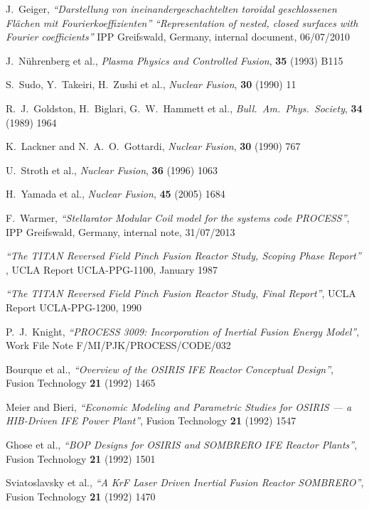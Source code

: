 \documentclass[11pt,a4paper]{report}
\begin{document}
\begin{thebibliography}{99}
J.\ Geiger,
\textit{``Darstellung von ineinandergeschachtelten toroidal geschlossenen
  Fl\"{a}chen mit Fourierkoeffizienten''} \textit{``Representation of
  nested, closed surfaces with Fourier coefficients''}
IPP Greifswald, Germany, internal document, 06/07/2010

J.\ N\"{u}hrenberg et al., \textit{Plasma Physics and Controlled Fusion},
\textbf{35} (1993) B115

S.\ Sudo, Y.\ Takeiri, H.\ Zushi et al., \textit{Nuclear Fusion}, \textbf{30} (1990)
11

R.\ J.\ Goldston, H.\ Biglari, G.\ W.\ Hammett et al.,
\textit{Bull.\ Am.\ Phys.\ Society}, \textbf{34} (1989) 1964

K.\ Lackner and N.\ A.\ O.\ Gottardi,
\textit{Nuclear Fusion}, \textbf{30} (1990) 767

U.\ Stroth et al.,
\textit{Nuclear Fusion}, \textbf{36} (1996) 1063

H.\ Yamada et al.,
\textit{Nuclear Fusion}, \textbf{45} (2005) 1684

F.\ Warmer,
\textit{``Stellarator Modular Coil model for the systems code PROCESS''},
IPP Greifswald, Germany, internal note, 31/07/2013

\textit{``The TITAN Reversed Field Pinch Fusion Reactor Study, Scoping Phase
Report''} ,
UCLA Report UCLA-PPG-1100, January 1987

\textit{``The TITAN Reversed Field Pinch Fusion Reactor Study, Final Report''},
UCLA Report UCLA-PPG-1200, 1990

P.\ J.\ Knight,
\textit{``PROCESS 3009: Incorporation of Inertial Fusion Energy Model''},
Work File Note F/MI/PJK/PROCESS/CODE/032

Bourque et al.,
\textit{``Overview of the OSIRIS IFE Reactor Conceptual Design''},
Fusion Technology \textbf{21} (1992) 1465

Meier and Bieri,
\textit{``Economic Modeling and Parametric Studies for OSIRIS --- a HIB-Driven
  IFE Power Plant''},
Fusion Technology \textbf{21} (1992) 1547

Ghose et al.,
\textit{``BOP Designs for OSIRIS and SOMBRERO IFE Reactor Plants''},
Fusion Technology \textbf{21} (1992) 1501

Sviatoslavsky et al.,
\textit{``A KrF Laser Driven Inertial Fusion Reactor SOMBRERO''},
Fusion Technology \textbf{21} (1992) 1470


\end{thebibliography}
\end{document}
